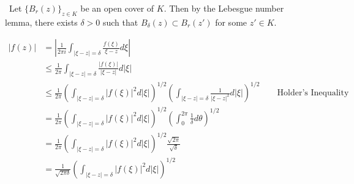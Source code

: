 \documentclass[12pt]{Homework}
\begin{document}
\begin{solution}$\,$
Let $\{B_r(z)\}_{z\in K}$ be an open cover of $K$. Then by the Lebesgue number lemma, there exists $\delta>0$ such that $B_\delta(z)\subset B_r(z')$ for some $z'\in K$.

\begin{align*}
    |f(z)|&=\left|\frac{1}{2\pi i}\int_{|\xi-z|=\delta}\frac{f(\xi)}{\xi-z}d\xi\right|\\
    &\le \frac{1}{2\pi}\int_{|\xi-z|=\delta}\frac{|f(\xi)|}{|\xi-z|}d|\xi|\\
    &\le \frac{1}{2\pi}\left(\int_{|\xi-z|=\delta}|f(\xi)|^2d|\xi|\right)^{1/2}\left(\int_{|\xi-z|=\delta}\frac{1}{|\xi-z|^2}d|\xi|\right)^{1/2}\qquad\text{Holder's Inequality}\\
    &=\frac{1}{2\pi}\left(\int_{|\xi-z|=\delta}|f(\xi)|^2d|\xi|\right)^{1/2}\left(\int_0^{2\pi}\frac{1}{\delta}d\theta\right)^{1/2}\\
    &=\frac{1}{2\pi}\left(\int_{|\xi-z|=\delta}|f(\xi)|^2d|\xi|\right)^{1/2}\frac{\sqrt{2\pi}}{\sqrt{\delta}}\\
    &=\frac{1}{\sqrt{2\pi\delta}}\left(\int_{|\xi-z|=\delta}|f(\xi)|^2d|\xi|\right)^{1/2}
\end{align*}

\end{solution}
\end{document}
